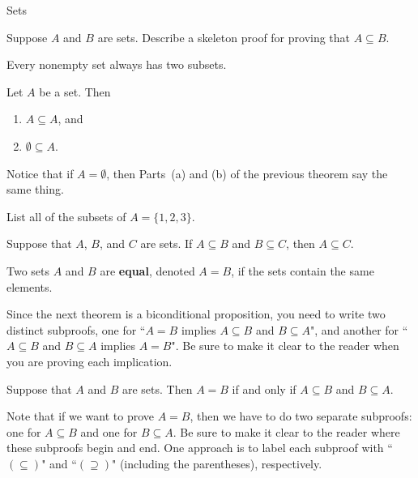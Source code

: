 \begin{section}{Sets}
\begin{problem}
Suppose $A$ and $B$ are sets.  Describe a skeleton proof for proving that $A\subseteq B$.
\end{problem}

Every nonempty set always has two subsets.

\begin{theorem}
Let $A$ be a set.  Then
\begin{enumerate}[label=\textrm{(\alph*)}]
\item $A\subseteq A$, and
\item $\emptyset \subseteq A$.
\end{enumerate}
\end{theorem}

Notice that if $A=\emptyset$, then Parts~(a) and (b) of the previous theorem say the same thing.

\begin{problem}
List all of the subsets of $A=\{1,2,3\}$.  %
\end{problem}

\begin{theorem}
Suppose that $A$, $B$, and $C$ are sets.  If $A\subseteq B$ and $B\subseteq C$, then $A\subseteq C$.
\end{theorem}

\begin{definition}
Two sets $A$ and $B$ are \textbf{equal}, denoted $\boxed{A=B}$, if the sets contain the same elements.
\end{definition}

Since the next theorem is a biconditional proposition, you need to write two distinct subproofs, one for ``$A=B$ implies $A \subseteq B$ and $B \subseteq A$", and another for ``$A \subseteq B$ and $B \subseteq A$ implies $A=B$". Be sure to make it clear to the reader when you are proving each implication.

\begin{theorem}
Suppose that $A$ and $B$ are sets. Then $A=B$ if and only if $A \subseteq B$ and $B \subseteq A$.
\end{theorem}

Note that if we want to prove $A=B$, then we have to do two separate subproofs: one for $A\subseteq B$ and one for $B\subseteq A$. Be sure to make it clear to the reader where these subproofs begin and end. One approach is to label each subproof with ``$(\subseteq)$" and ``$(\supseteq)$" (including the parentheses), respectively.


\end{section}
